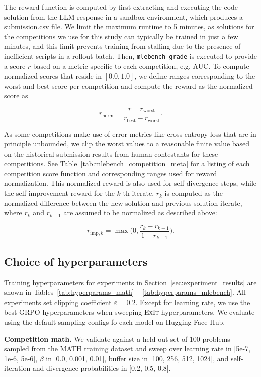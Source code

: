 \documentclass[10pt]{article} %
\newcommand{\methodname}{\textsc{ExIt}}
\begin{document}
The reward function is computed by first extracting and executing the code solution from the LLM response in a sandbox environment, which produces a submission.csv file. We limit the maximum runtime to 5 minutes, as solutions for the competitions we use for this study can typically be trained in just a few minutes, and this limit prevents training from stalling due to the presence of inefficient scripts in a rollout batch. Then, \texttt{mlebench grade} is executed to provide a score $r$ based on a metric specific to each competition, e.g. AUC. To compute normalized scores that reside in $[0.0, 1.0]$, we define ranges corresponding to the worst and best score per competition and compute the reward as the normalized score as

\[
r_{\text{norm}} = \frac{r - r_{\text{worst}}}{r_{\text{best}} - r_{\text{worst}}}.
\]

As some competitions make use of error metrics like cross-entropy loss that are in principle unbounded, we clip the worst values to a reasonable finite value based on the historical submission results from human contestants for these competitions. See Table~\ref{tab:mlebench_competition_meta} for a listing of each competition score function and corresponding ranges used for reward normalization. This normalized reward is also used for self-divergence steps, while the self-improvement reward for the $k$-th iterate, $r_{k}$ is computed as the normalized difference between the new solution and previous solution iterate, where $r_k$ and $r_{k-1}$ are assumed to be normalized as described above:

\[
r_{\text{imp},k} = \max\bigg(0, \frac{r_{k} - r_{k-1}}{1 - r_{k-1}}\bigg).
\]

\subsection{Choice of hyperparameters}
\label{app:hps}

Training hyperparameters for experiments in Section~\ref{sec:experiment_results} are shown in Tables~\ref{tab:hyperparams_math} – \ref{tab:hyperparams_mlebench}. All experiments set clipping coefficient $\varepsilon = 0.2$. Except for learning rate, we use the best GRPO hyperparameters when sweeping \methodname{} hyperparameters. We evaluate using the default sampling configs fo each model on Hugging Face Hub.


\textbf{Competition math.} We validate against a held-out set of 100 problems sampled from the MATH training dataset and sweep over learning rate in [5e-7, 1e-6, 5e-6], $\beta$ in [0.0, 0.001, 0.01], buffer size in [100, 256, 512, 1024], and self-iteration and divergence probabilities in [0.2, 0.5, 0.8].
\end{document}

